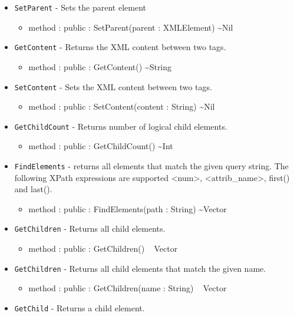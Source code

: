 \documentclass[12pt]{article}
\begin{document}
\begin{itemize}
\begin{itemize}
  \end{itemize}
\item \texttt{SetParent} - Sets the parent element
  \begin{itemize}
  \item method : public : SetParent(parent : XMLElement) \textasciitilde Nil
  \end{itemize}
\item \texttt{GetContent} - Returns the XML content between two tags.
  \begin{itemize}
  \item method : public : GetContent() \textasciitilde String
  \end{itemize}
\item \texttt{SetContent} - Sets the XML content between two tags.
  \begin{itemize}
  \item method : public : SetContent(content : String) \textasciitilde Nil
  \end{itemize}
\item \texttt{GetChildCount} - Returns number of logical child
  elements.
  \begin{itemize}
  \item method : public : GetChildCount() \textasciitilde Int
  \end{itemize}
\item \texttt{FindElements} - returns all elements that match the
  given query string.  The following XPath expressions are supported
  <num>, <attrib\_name>, first() and last().
  \begin{itemize}
  \item method : public : FindElements(path : String) \textasciitilde Vector
  \end{itemize}
\item \texttt{GetChildren} - Returns all child elements.
  \begin{itemize}
  \item method : public : GetChildren() ~ Vector
  \end{itemize}
\item \texttt{GetChildren} - Returns all child elements that match the
  given name.
  \begin{itemize}
  \item method : public : GetChildren(name : String) ~ Vector
  \end{itemize}
\item \texttt{GetChild} - Returns a child element.
  \begin{itemize}

\end{itemize}
\end{itemize}
\end{document}
